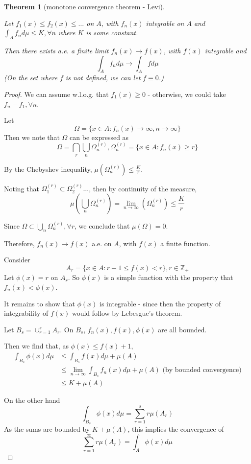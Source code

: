 \documentclass[11pt,a4paper]{report}
\theoremstyle{plain}
\newtheorem{thm}{Theorem}[section]
\theoremstyle{definition}
\theoremstyle{remark}
\newcommand{\union}{\cup}
\newcommand{\Union}{\bigcup}
\newcommand{\Intersection}{\bigcap}
\newcommand{\Z}{\mathbb{Z}}
\begin{document}
\begin{thm}[monotone convergence theorem - Levi]\label{levi_theorem}

    Let $f_1(x) \le f_2(x) \le \dots$ on $A$, with $f_n(x)$ integrable on $A$ and $\int_A f_n d\mu \le K, \forall n$ where $K$ is some constant.

    Then there exists a.e. a finite limit $f_n(x) \rightarrow f(x)$, with $f(x)$ integrable and 
    $$ \int_A f_n d\mu \rightarrow \int_A f d\mu $$
    (On the set where $f$ is not defined, we can let $f \equiv 0$.)
\end{thm}

\begin{proof}
    We can assume w.l.o.g. that $f_1(x) \ge 0$ - otherwise, we could take $f_n - f_1, \forall n$.

    Let 
    $$\Omega = \{ x \in A : f_n(x) \rightarrow \infty, n \rightarrow \infty \}$$
    Then we note that $\Omega$ can be expressed as
    $$\Omega = \Intersection_r \Union_n \Omega_n^{(r)}, \Omega_n^{(r)} = \{ x \in A : f_n(x) \ge r \} $$

    By the Chebyshev inequality, $\mu(\Omega_n^{(r)}) \le \frac{K}{r}$.

    Noting that $\Omega_1^{(r)} \subset \Omega_2^{(r)} \dots$, then by continuity of the measure,
    $$ \mu(\Union_n \Omega_n^{(r)}) = \lim_{n \rightarrow \infty}(\Omega_n^{(r)}) \le \frac{K}{r} $$

    Since $\Omega \subset \Union_n \Omega_n^{(r)}, \forall r$, we conclude that $\mu(\Omega) = 0$.

    Therefore, $f_n(x) \rightarrow f(x)$ a.e. on $A$, with $f(x)$ a finite function.

    Consider
    $$A_r = \{ x \in A : r - 1 \le f(x) < r \}, r \in \Z_{+}$$
    Let $\phi(x)  = r$ on $A_r$. So $\phi(x)$ is a simple function with the property that $f_n(x) < \phi(x)$.

    It remains to show that $\phi(x)$ is integrable - since then the property of integrability of $f(x)$ would follow by Lebesgue's theorem.

    Let $ B_s = \union_{r=1}^s A_r $. On $B_s$, $f_n(x), f(x), \phi(x)$ are all bounded.

    Then we find that, as $\phi(x) \le f(x) + 1$,
    \begin{align*}
        \int_{B_s} \phi(x) d\mu &\le \int_{B_s} f(x) d\mu + \mu(A) \\
                                &\le \lim_{n \rightarrow \infty} \int_{B_s} f_n(x) d\mu + \mu(A) \text{ (by bounded convergence)} \\
                                &\le K + \mu(A)
    \end{align*}

    On the other hand
    $$ \int_{B_s} \phi(x) d\mu = \sum_{r=1}^s r \mu(A_r) $$
    As the sums are bounded by $K + \mu(A)$, this implies the convergence of
    $$ \sum_{r=1}^\infty r \mu(A_r) = \int_A \phi(x) d\mu $$
\end{proof}
\end{document}
